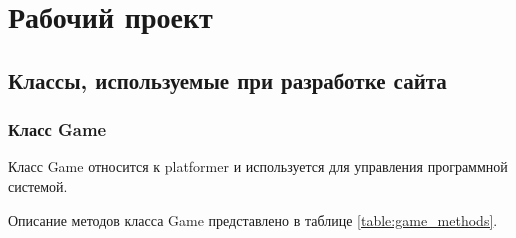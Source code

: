 \section{Рабочий проект}
\subsection{Классы, используемые при разработке сайта}

\subsubsection{Класс Game}

Класс Game относится к platformer и используется для управления программной системой.

Описание методов класса Game представлено в таблице \ref{table:game_methods}.
\renewcommand{\arraystretch}{0.8} %
